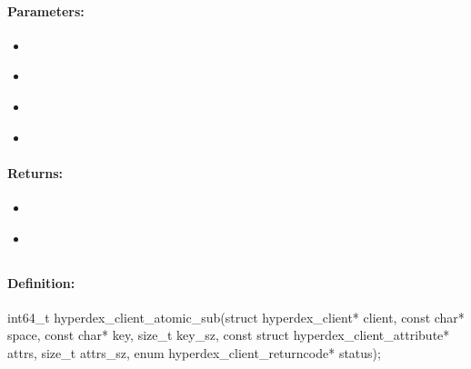 \paragraph{Parameters:}
\begin{itemize}[noitemsep]
\item {}\\

\item {}\\

\item {}\\

\item {}\\

\end{itemize}

\paragraph{Returns:}
\begin{itemize}[noitemsep]
\item {}\\

\item {}\\

\end{itemize}

\pagebreak
\subsection{}
\label{api:c:atomic_sub}


\paragraph{Definition:}
\begin{ccode}
int64_t hyperdex_client_atomic_sub(struct hyperdex_client* client,
        const char* space,
        const char* key, size_t key_sz,
        const struct hyperdex_client_attribute* attrs, size_t attrs_sz,
        enum hyperdex_client_returncode* status);
\end{ccode}

